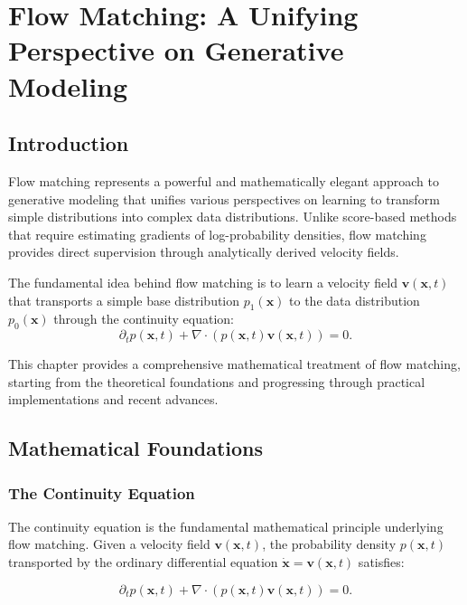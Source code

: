 \chapter{Flow Matching: A Unifying Perspective on Generative Modeling}

\section{Introduction}

Flow matching represents a powerful and mathematically elegant approach to generative modeling that unifies various perspectives on learning to transform simple distributions into complex data distributions. Unlike score-based methods that require estimating gradients of log-probability densities, flow matching provides direct supervision through analytically derived velocity fields.

The fundamental idea behind flow matching is to learn a velocity field $\mathbf{v}(\mathbf{x},t)$ that transports a simple base distribution $p_1(\mathbf{x})$ to the data distribution $p_0(\mathbf{x})$ through the continuity equation:
\begin{equation}
    \partial_t p(\mathbf{x},t) + \nabla \cdot (p(\mathbf{x},t) \mathbf{v}(\mathbf{x},t)) = 0.
\end{equation}

This chapter provides a comprehensive mathematical treatment of flow matching, starting from the theoretical foundations and progressing through practical implementations and recent advances.

\section{Mathematical Foundations}

\subsection{The Continuity Equation}

The continuity equation is the fundamental mathematical principle underlying flow matching. Given a velocity field $\mathbf{v}(\mathbf{x},t)$, the probability density $p(\mathbf{x},t)$ transported by the ordinary differential equation $\dot{\mathbf{x}} = \mathbf{v}(\mathbf{x},t)$ satisfies:

\begin{equation}
    \partial_t p(\mathbf{x},t) + \nabla \cdot (p(\mathbf{x},t) \mathbf{v}(\mathbf{x},t)) = 0.
\end{equation}

